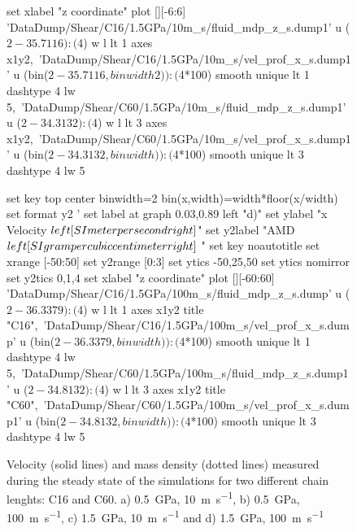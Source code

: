 \documentclass[5p]{elsarticle}
\begin{document}
\begin{figure}[htp]
\begin{center}
\begin{gnuplot}[terminal=epslatex, terminaloptions={size \SERFigwidth cm, \SERFigheight cm color solid}]
			set xlabel "z coordinate"  
			plot  	[][-6:6]  'DataDump/Shear/C16/1.5GPa/10m_s/fluid_mdp_z_s.dump1' u ($2-35.7116):($4) w l  lt 1 axes x1y2,\ 								
				              'DataDump/Shear/C16/1.5GPa/10m_s/vel_prof_x_s.dump1'  u (bin($2-35.7116,binwidth2)):($4*100) smooth unique lt 1 dashtype 4  lw 5,\	
                             		    'DataDump/Shear/C60/1.5GPa/10m_s/fluid_mdp_z_s.dump1' u ($2-34.3132):($4) w l  lt 3  axes x1y2,\ 								
				              'DataDump/Shear/C60/1.5GPa/10m_s/vel_prof_x_s.dump1'  u (bin($2-34.3132,binwidth)):($4*100) smooth unique lt 3 dashtype 4  lw 5		
		\end{gnuplot}
		\begin{gnuplot}[terminal=epslatex, terminaloptions={size \SERFigwidth cm, \SERFigheight cm color solid}]
		set key top center
			binwidth=2
			bin(x,width)=width*floor(x/width)
			set format y2 '%
			set label at graph 0.03,0.89 left "d)"
			set ylabel "x Velocity $\\left[ \\SI{}{\\meter\\per\\second} \\right]$"
			set y2label "AMD $\\left[ \\SI{}{\\gram\\per\\cubic\\centi\\meter} \\right]$ "
			set key noautotitle
			set xrange [-50:50]
			set y2range [0:3]
			set ytics  -50,25,50
			set ytics nomirror
			set y2tics 0,1,4
			set xlabel "z coordinate"  
			plot  	[][-60:60]  'DataDump/Shear/C16/1.5GPa/100m_s/fluid_mdp_z_s.dump' u ($2-36.3379):($4) w l  lt 1 axes x1y2 title "C16",\ 						
				              'DataDump/Shear/C16/1.5GPa/100m_s/vel_prof_x_s.dump'  u (bin($2-36.3379,binwidth)):($4*100) smooth unique lt 1 dashtype 4  lw 5,\ 
                             		     'DataDump/Shear/C60/1.5GPa/100m_s/fluid_mdp_z_s.dump1' u ($2-34.8132):($4) w l  lt 3  axes x1y2 title "C60",\ 						
				              'DataDump/Shear/C60/1.5GPa/100m_s/vel_prof_x_s.dump1'  u (bin($2-34.8132,binwidth)):($4*100) smooth unique lt 3 dashtype 4  lw 5 	
		\end{gnuplot}
		
		\caption{Velocity (solid lines) and mass density (dotted lines) measured during the steady state of the simulations for two different chain lenghts: C16 and C60. a) \SI{0.5}{\giga\pascal},  \SI{10}{\meter\per\second},   b) \SI{0.5}{\giga\pascal},  \SI{100}{\meter\per\second}, c) \SI{1.5}{\giga\pascal},  \SI{10}{\meter\per\second} and    d) \SI{1.5}{\giga\pascal},  \SI{100}{\meter\per\second}} 
		\label{fig:VelProf_MDP2}
	\end{center}
 \end{figure}
\end{document}
